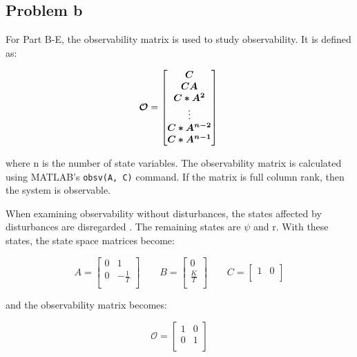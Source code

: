 \subsection{Problem b}
For Part B-E, the observability matrix is used to study observability. It is defined as:

\begin{equation}
  \bm{\mathcal{O}} =
  \begin{bmatrix}
    \bm{C} \\
    \bm{CA} \\
    \bm{C*A^2} \\
    \vdots \\
    \bm{C*A^{n-2}} \\
    \bm{C*A^{n-1}} \\
  \end{bmatrix} \\
\end{equation}

where n is the number of state variables. The observability matrix is calculated using MATLAB's \texttt{obsv(A, C)} command.  If the matrix is full column rank, then the system is observable.

When examining observability without disturbances, the states affected by disturbances are disregarded . The remaining states are $\psi$ and r. With these states, the state space matrices become:

\begin{equation}
    A = 
	\begin{bmatrix}
    0 & 1            \\
	0 & -\frac{1}{T} \\
	\end{bmatrix}
  \qquad
  B =
  \begin{bmatrix}
	0 \\
    \frac{K}{T} \\
  \end{bmatrix}
  \qquad
  C =
  \begin{bmatrix}
    1 & 0\\
  \end{bmatrix}
\end{equation}

and the observability matrix becomes:

\begin{equation}
  \bm{\mathcal{O}} =
  \begin{bmatrix}
    1 & 0 \\
    0 & 1 \\
  \end{bmatrix}
\end{equation}

